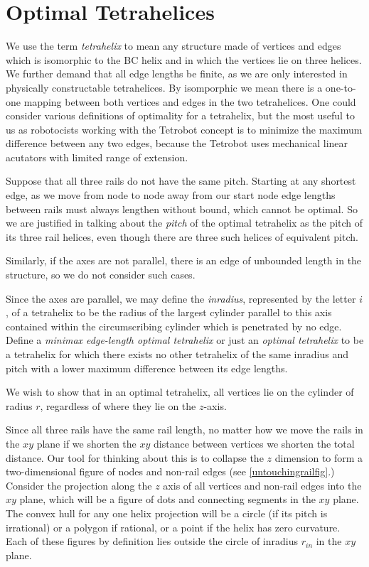 \documentclass[review]{siamonline1116}
\begin{document}
\section{Optimal Tetrahelices}

We use the term \emph{tetrahelix} to mean any structure made of
vertices and edges which is isomorphic to the BC helix and in which the
vertices lie on three helices. We further demand that all edge lengths
be finite, as we are only interested in physically constructable tetrahelices.
By isomporphic we mean there is a one-to-one mapping between both
vertices and edges in the two tetrahelices.
One could consider various definitions of optimality for a
tetrahelix, but the most useful to us as robotocists working with the Tetrobot
concept is to minimize the
maximum difference between any two edges, because the Tetrobot uses
mechanical linear acutators with
limited range of extension.


Suppose that all three rails do not have the same pitch. Starting at any shortest edge, as we move
from node to node away from our start node edge lengths between rails must always lengthen without bound,
which cannot be optimal.
So we are justified in talking about the
\emph{pitch} of 
the optimal tetrahelix as the pitch of its three rail helices, even though there are
three such helices of equivalent pitch.

Similarly, if the axes are not parallel, there is an edge of
unbounded length in the structure, so we do not consider such cases.

Since the axes are parallel, we may define the \emph{inradius}, represented by the letter $i$, of a
tetrahelix to be the radius of the largest
cylinder parallel to this axis contained within the circumscribing cylinder
which is penetrated by no edge.
Define a \emph{minimax edge-length optimal tetrahelix} or just an
\emph{optimal tetrahelix} to be a tetrahelix for which there exists
no other tetrahelix of the same inradius and pitch with a lower maximum
difference between its edge lengths. 

We wish to show that in an optimal tetrahelix, all vertices lie on the cylinder
of radius $r$, regardless of where they lie on the $z$-axis.

Since all three rails have the same rail length, no matter how we
move the rails in the $xy$ plane if we shorten the $xy$ distance between
vertices we shorten the total distance.
Our tool for thinking about this is to collapse the $z$ dimension to form
a two-dimensional figure of nodes and non-rail edges (see \cref{untouchingrailfig}.)
Consider the projection along the $z$ axis of all vertices and non-rail edges into the $xy$ plane, which will be
a figure of dots and connecting segments in the $xy$ plane. The convex
hull for any one helix projection will be a circle (if its pitch is
irrational) or a polygon if rational, or a point if the helix has
zero curvature. Each of these figures by definition lies outside the
circle of inradius $r_{in}$ in the $xy$ plane.
\end{document}
